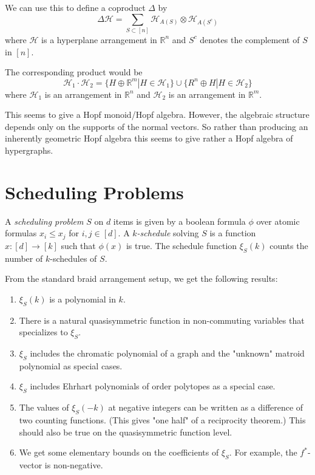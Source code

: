 \documentclass[11pt,letter]{amsart}
\newcommand{\RR}{\mathbb{R}}
\newcommand{\HHH}{\mathcal{H}}
\newcommand{\defn}[1]{\emph{#1}}
\begin{document}
We can use this to define a coproduct $\Delta$ by
\[
\Delta\HHH = \sum_{S\subset[n]} \HHH_{A(S)} \otimes \HHH_{A(S^c)}
\]
where $\HHH$ is a hyperplane arrangement in $\RR^n$ and $S^c$ denotes the complement of $S$ in $[n]$.

The corresponding product would be
\[
  \HHH_1 \cdot \HHH_2 = \{H \oplus \RR^m | H\in \HHH_1 \} \cup \{R^n \oplus H | H\in \HHH_2 \}
\]
where $\HHH_1$ is an arrangement in $\RR^n$ and $\HHH_2$ is an arrangement in $\RR^m$.

This seems to give a Hopf monoid/Hopf algebra. However, the algebraic structure depends only on the supports of the normal vectors. So rather than producing an inherently geometric Hopf algebra this seems to give rather a Hopf algebra of hypergraphs.


\section{Scheduling Problems}

A \defn{scheduling problem} $S$ on $d$ items is given by a boolean formula $\phi$ over atomic formulas $x_i\leq x_j$ for $i,j\in[d]$. A \defn{$k$-schedule} solving $S$ is a function $x:[d]\rightarrow[k]$ such that $\phi(x)$ is true. The schedule function $\xi_S(k)$ counts the number of $k$-schedules of $S$.

From the standard braid arrangement setup, we get the following results:
\begin{enumerate}
\item $\xi_S(k)$ is a polynomial in $k$.
\item There is a natural quasisymmetric function in non-commuting variables that specializes to $\xi_S$.
\item $\xi_S$ includes the chromatic polynomial of a graph and the "unknown" matroid polynomial as special cases.
\item $\xi_S$ includes Ehrhart polynomials of order polytopes as a special case.
\item The values of $\xi_S(-k)$ at negative integers can be written as a difference of two counting functions. (This gives "one half" of a reciprocity theorem.) This should also be true on the quasisymmetric function level.
\item We get some elementary bounds on the coefficients of $\xi_S$. For example, the $f^*$-vector is non-negative. 
\end{enumerate}
\end{document}
